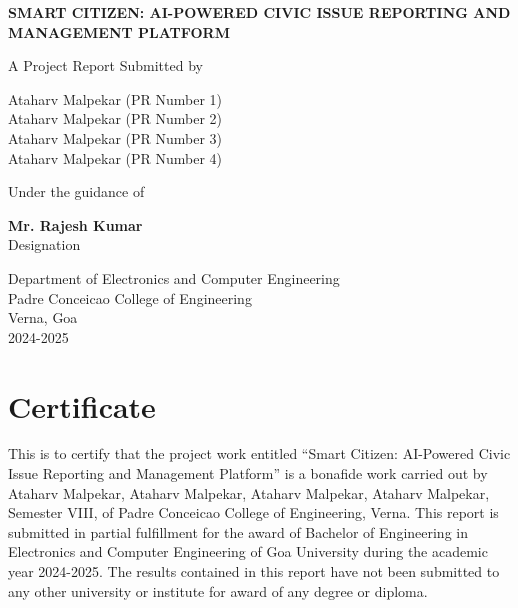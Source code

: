 \documentclass[12pt,a4paper]{report}
\begin{document}
\begin{titlepage}
    \centering
    \vspace*{1cm}
    
    {\fontsize{16}{19.2}\bfseries\MakeUppercase{Smart Citizen: AI-Powered Civic Issue Reporting and Management Platform}\par}
    
    \vspace{2cm}
    
    {\fontsize{12}{14.4}\selectfont A Project Report Submitted by\par}
    \vspace{1cm}
    
    {\fontsize{12}{14.4}\selectfont
    Ataharv Malpekar (PR Number 1)\\
    Ataharv Malpekar (PR Number 2)\\
    Ataharv Malpekar (PR Number 3)\\
    Ataharv Malpekar (PR Number 4)\par}
    
    \vspace{2cm}
    {\fontsize{12}{14.4}\selectfont Under the guidance of\par}
    \vspace{0.5cm}
    
    {\fontsize{12}{14.4}\selectfont \textbf{Mr. Rajesh Kumar}\\Designation\par}
    
    \vfill
    
    \vspace{1cm}
    
    {\fontsize{12}{14.4}\selectfont
    Department of Electronics and Computer Engineering\\
    Padre Conceicao College of Engineering\\
    Verna, Goa\\
    2024-2025\par}
\end{titlepage}

\chapter*{Certificate}
This is to certify that the project work entitled ``Smart Citizen: AI-Powered Civic Issue Reporting and Management Platform” is a bonafide work carried out by Ataharv Malpekar, Ataharv Malpekar, Ataharv Malpekar, Ataharv Malpekar, Semester VIII, of Padre Conceicao College of Engineering, Verna. This report is submitted in partial fulfillment for the award of Bachelor of Engineering in Electronics and Computer Engineering of Goa University during the academic year 2024-2025. The results contained in this report have not been submitted to any other university or institute for award of any degree or diploma.
\end{document}
